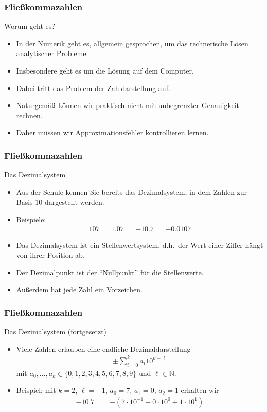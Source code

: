 \documentclass{beamer}
\title[Annuma]{\mytitle}
\author[Amin Coja-Oghlan]{Amin Coja-Oghlan}
\institute[Frankfurt]{JWGUFFM}
\date{}
\newcommand\NN{\mathbb N}
\newcommand\bc[1]{\left({#1}\right)}
\renewcommand{\ae}{\"a}
\renewcommand{\oe}{\"o}
\newcommand{\ue}{\"u}
\newcommand{\mytitle}{Flie\ss kommazahlen}
\begin{document}
\frame[plain]{\titlepage}

\begin{frame}\frametitle{\mytitle}
	\begin{block}{Worum geht es?}
		\begin{itemize}
			\item In der Numerik geht es, allgemein gesprochen, um das rechnerische L\"osen analytischer Probleme.
			\item Insbesondere geht es um die L\"osung auf dem Computer.
			\item Dabei tritt das Problem der Zahldarstellung auf.
			\item Naturgem\ae\ss\ k\oe nnen wir praktisch nicht mit unbegrenzter Genauigkeit rechnen.
			\item Daher m\ue ssen wir Approximationsfehler kontrollieren lernen.
		\end{itemize}
	\end{block}
\end{frame}

\begin{frame}\frametitle{\mytitle}
	\begin{block}{Das Dezimalsystem}
		\begin{itemize}
			\item Aus der Schule kennen Sie bereits das \alert{Dezimalsystem}, in dem Zahlen zur Basis $10$ dargestellt werden.
			\item \alert{Beispiele:}
				\begin{align*}
					107&&1.07&&-10.7&&-0.0107
				\end{align*}
			\item Das Dezimalsystem ist ein \alert{Stellenwertsystem}, d.h.\ der Wert einer Ziffer h\ae ngt von ihrer Position ab.
			\item Der \alert{Dezimalpunkt} ist der ``Nullpunkt'' f\"ur die Stellenwerte.
			\item Au\ss erdem hat jede Zahl ein \alert{Vorzeichen}.
		\end{itemize}
	\end{block}
\end{frame}

\begin{frame}\frametitle{\mytitle}
	\begin{block}{Das Dezimalsystem (fortgesetzt)}
		\begin{itemize}
			\item Viele Zahlen erlauben eine endliche Dezimaldarstellung
				\begin{align*}
					\pm\sum_{i=0}^ka_i10^{k-\ell}
				\end{align*}
				mit $a_0,\ldots,a_k\in\{0,1,2,3,4,5,6,7,8,9\}$ und $\ell\in\NN$.
			\item \alert{Beispiel:} mit $k=2$, $\ell=-1$, $a_0=7$, $a_1=0$, $a_2=1$ erhalten wir
				\begin{align*}
					-10.7&=-\bc{7\cdot10^{-1}+0\cdot10^0+1\cdot10^1}
				\end{align*}
		\end{itemize}
	\end{block}
\end{frame}
\end{document}
